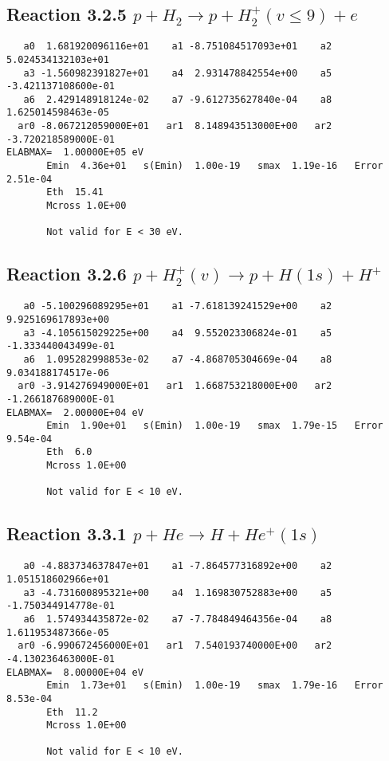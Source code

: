 \documentclass[12pt,dvipdfmx]{article}
\begin{document}
\newpage
\subsection{
Reaction 3.2.5 $   p + H_2 \rightarrow p + H_2^+(v \leq 9) + e$}


\begin{small}\begin{verbatim}
   a0  1.681920096116e+01    a1 -8.751084517093e+01    a2  5.024534132103e+01
   a3 -1.560982391827e+01    a4  2.931478842554e+00    a5 -3.421137108600e-01
   a6  2.429148918124e-02    a7 -9.612735627840e-04    a8  1.625014598463e-05
  ar0 -8.067212059000E+01   ar1  8.148943513000E+00   ar2 -3.720218589000E-01
ELABMAX=  1.00000E+05 eV
       Emin  4.36e+01   s(Emin)  1.00e-19   smax  1.19e-16   Error  2.51e-04
       Eth  15.41
       Mcross 1.0E+00

       Not valid for E < 30 eV.
\end{verbatim}\end{small}







\newpage
\subsection{
Reaction 3.2.6 $   p + H_2^+(v) \rightarrow p + H(1s) + H^+$}


\begin{small}\begin{verbatim}
   a0 -5.100296089295e+01    a1 -7.618139241529e+00    a2  9.925169617893e+00
   a3 -4.105615029225e+00    a4  9.552023306824e-01    a5 -1.333440043499e-01
   a6  1.095282998853e-02    a7 -4.868705304669e-04    a8  9.034188174517e-06
  ar0 -3.914276949000E+01   ar1  1.668753218000E+00   ar2 -1.266187689000E-01
ELABMAX=  2.00000E+04 eV
       Emin  1.90e+01   s(Emin)  1.00e-19   smax  1.79e-15   Error  9.54e-04
       Eth  6.0
       Mcross 1.0E+00

       Not valid for E < 10 eV.
\end{verbatim}\end{small}

\newpage
\subsection{
Reaction 3.3.1 $   p + He \rightarrow  H + He^+(1s)$}


\begin{small}\begin{verbatim}
   a0 -4.883734637847e+01    a1 -7.864577316892e+00    a2  1.051518602966e+01
   a3 -4.731600895321e+00    a4  1.169830752883e+00    a5 -1.750344914778e-01
   a6  1.574934435872e-02    a7 -7.784849464356e-04    a8  1.611953487366e-05
  ar0 -6.990672456000E+01   ar1  7.540193740000E+00   ar2 -4.130236463000E-01
ELABMAX=  8.00000E+04 eV
       Emin  1.73e+01   s(Emin)  1.00e-19   smax  1.79e-16   Error  8.53e-04
       Eth  11.2
       Mcross 1.0E+00

       Not valid for E < 10 eV.
\end{verbatim}\end{small}
\end{document}
